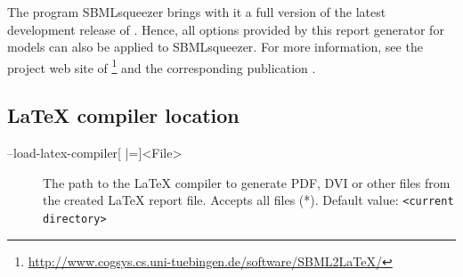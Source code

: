 The program SBMLsqueezer brings with it a full version of the latest development
release of \SBMLLaTeX. Hence, all options provided by this report generator for
\SBML models can also be applied to SBMLsqueezer. For more information, see
the project web site of
\SBMLLaTeX\footnote{\url{http://www.cogsys.cs.uni-tuebingen.de/software/SBML2LaTeX/}}
and the corresponding publication \citep{Draeger2009b}.

\subsection{LaTeX compiler location}
\begin{description}
\item[--load-latex-compiler{[} |={]}<File>]
  The path to the \LaTeX{} compiler to generate PDF, DVI or other
  files from the created \LaTeX{} report file. Accepts all files
  (*).
  Default value: \texttt{<current directory>}
\end{description}

